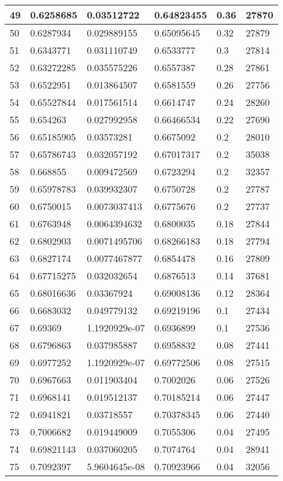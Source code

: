 \begin{longtable}{|l|l|l|l|l|l|}
49 & 0.6258685 & 0.03512722 & 0.64823455 & 0.36 & 27870 \\ \hline 
50 & 0.6287934 & 0.029889155 & 0.65095645 & 0.32 & 27879 \\ \hline 
51 & 0.6343771 & 0.031110749 & 0.6533777 & 0.3 & 27814 \\ \hline 
52 & 0.63272285 & 0.035575226 & 0.6557387 & 0.28 & 27861 \\ \hline 
53 & 0.6522951 & 0.013864507 & 0.6581559 & 0.26 & 27756 \\ \hline 
54 & 0.65527844 & 0.017561514 & 0.6614747 & 0.24 & 28260 \\ \hline 
55 & 0.654263 & 0.027992958 & 0.66466534 & 0.22 & 27690 \\ \hline 
56 & 0.65185905 & 0.03573281 & 0.6675092 & 0.2 & 28010 \\ \hline 
57 & 0.65786743 & 0.032057192 & 0.67017317 & 0.2 & 35038 \\ \hline 
58 & 0.668855 & 0.009472569 & 0.6723294 & 0.2 & 32357 \\ \hline 
59 & 0.65978783 & 0.039932307 & 0.6750728 & 0.2 & 27787 \\ \hline 
60 & 0.6750015 & 0.0073037413 & 0.6775676 & 0.2 & 27737 \\ \hline 
61 & 0.6763948 & 0.0064394632 & 0.6800035 & 0.18 & 27844 \\ \hline 
62 & 0.6802903 & 0.0071495706 & 0.68266183 & 0.18 & 27794 \\ \hline 
63 & 0.6827174 & 0.0077467877 & 0.6854478 & 0.16 & 27809 \\ \hline 
64 & 0.67715275 & 0.032032654 & 0.6876513 & 0.14 & 37681 \\ \hline 
65 & 0.68016636 & 0.03367924 & 0.69008136 & 0.12 & 28364 \\ \hline 
66 & 0.6683032 & 0.049779132 & 0.69219196 & 0.1 & 27434 \\ \hline 
67 & 0.69369 & 1.1920929e-07 & 0.6936899 & 0.1 & 27536 \\ \hline 
68 & 0.6796863 & 0.037985887 & 0.6958832 & 0.08 & 27441 \\ \hline 
69 & 0.6977252 & 1.1920929e-07 & 0.69772506 & 0.08 & 27515 \\ \hline 
70 & 0.6967663 & 0.011903404 & 0.7002026 & 0.06 & 27526 \\ \hline 
71 & 0.6968141 & 0.019512137 & 0.70185214 & 0.06 & 27447 \\ \hline 
72 & 0.6941821 & 0.03718557 & 0.70378345 & 0.06 & 27440 \\ \hline 
73 & 0.7006682 & 0.019449009 & 0.7055306 & 0.04 & 27495 \\ \hline 
74 & 0.69821143 & 0.037060205 & 0.7074764 & 0.04 & 28941 \\ \hline 
75 & 0.7092397 & 5.9604645e-08 & 0.70923966 & 0.04 & 32056 \\ \hline 
\end{longtable}